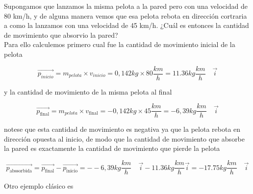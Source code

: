 \vspace{0.2cm}
\begin{tcolorbox}
Supongamos que lanzamos la misma pelota a la pared pero con una velocidad de 80 km/h, y de alguna manera vemos que esa pelota rebota en dirección cortraria a como la lanzamos con una velocidad de 45 km/h. ¿Cuál es entonces la cantidad de movimiento que absorvio la pared?\\

Para ello calculemos primero cual fue la cantidad de movimiento inicial de la pelota

\begin{equation*}
\vec{p_{inicio}} = m_{pelota}\times v_{inicio}= 0,142 kg\times 80 \frac{km}{h} = 11.36 kg \frac{km}{h}\quad \vec{i}
\end{equation*}

y la cantidad de movimiento de la misma pelota al final

\begin{equation*}
\vec{p_{\text{final}}} = m_{pelota}\times v_{\text{final}}= -0,142 kg\times 45 \frac{km}{h} = -6,39 kg \frac{km}{h} \quad \vec{i}
\end{equation*}

notese que esta cantidad de movimiento es negativa ya que la pelota rebota en dirección opuesta al inicio, de modo que la cantidad de movimiento que absorbe la pared es exactamente la cantidad de movimiento que pierde la pelota

\begin{equation*}
\vec{p_{\text{abssorbida}}}= \vec{p_{\text{final}}}-\vec{p_{\text{inicio}}}=--6,39 kg \frac{km}{h} \quad \vec{i}-11.36 kg \frac{km}{h} \vec{i}= -17.75 kg \frac{km}{h}\quad \vec{i}
\end{equation*}

\end{tcolorbox}

\newpage
Otro ejemplo clásico es

